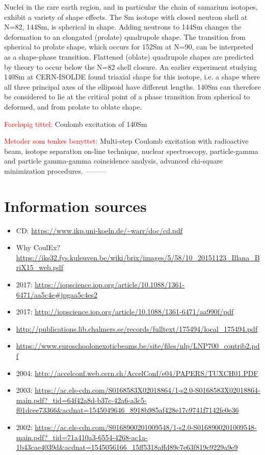 \documentclass[twoside,english]{uiofysmaster/uiofysmaster}
\begin{document}
Nuclei in the rare earth region, and in particular the chain of samarium isotopes, exhibit a variety of shape effects. The Sm isotope with closed neutron shell at N=82, 144Sm, is spherical in shape. Adding neutrons to 144Sm changes the deformation to an elongated (prolate) quadrupole shape. The transition from spherical to prolate shape, which occurs for 152Sm at N=90, can be interpreted as a shape-phase transition. Flattened (oblate) quadrupole shapes are predicted by theory to occur below the N=82 shell closure. An earlier experiment studying 140Sm at CERN-ISOLDE found triaxial shape for this isotope, i.e. a shape where all three principal axes of the ellipsoid have different lengths. 140Sm can therefore be considered to lie at the critical point of a phase transition from spherical to deformed, and from prolate to oblate shape. \newline

\textcolor{red}{Foreløpig tittel:} \newline
Coulomb excitation of 140Sm \newline


\textcolor{red}{Metoder som tenkes benyttet:} \newline
Multi-step Coulomb excitation with radioactive beam, isotope separation on-line technique, nuclear spectroscopy, particle-gamma and particle gamma-gamma coincidence analysis, advanced chi-square minimization procedures. \newline
\textcolor{red}{---------} \newline


\section{Information sources}
\begin{itemize}  
\item CD: \url{https://www.ikp.uni-koeln.de/~warr/doc/cd.pdf}
\item Why CoulEx? \url{https://iks32.fys.kuleuven.be/wiki/brix/images/5/58/10_20151123_Illana_BriX15_web.pdf}
\item 2017: \url{https://iopscience.iop.org/article/10.1088/1361-6471/aa5c4e#jpgaa5c4es2}
\item 2017: \url{http://iopscience.iop.org/article/10.1088/1361-6471/aa990f/pdf}
\item \url{http://publications.lib.chalmers.se/records/fulltext/175494/local_175494.pdf}
\item \url{https://www.euroschoolonexoticbeams.be/site/files/nlp/LNP700_contrib2.pdf}
\item 2004: \url{http://accelconf.web.cern.ch/AccelConf/e04/PAPERS/TUXCH01.PDF}
\item 2003: \url{https://ac.els-cdn.com/S0168583X02018864/1-s2.0-S0168583X02018864-main.pdf?_tid=64f42a8d-b37c-42a6-a3c5-f01dcee73366&acdnat=1545049646_8918b985af428e17c9741f7142fe0e36} 
\item 2002: \url{https://ac.els-cdn.com/S0168900201009548/1-s2.0-S0168900201009548-main.pdf?_tid=71a410a3-6554-4268-ac1a-1b43cae4039d&acdnat=1545056166_15ff5318affd89c7e63f819c9229a9e9}
\end{itemize}
\end{document}
